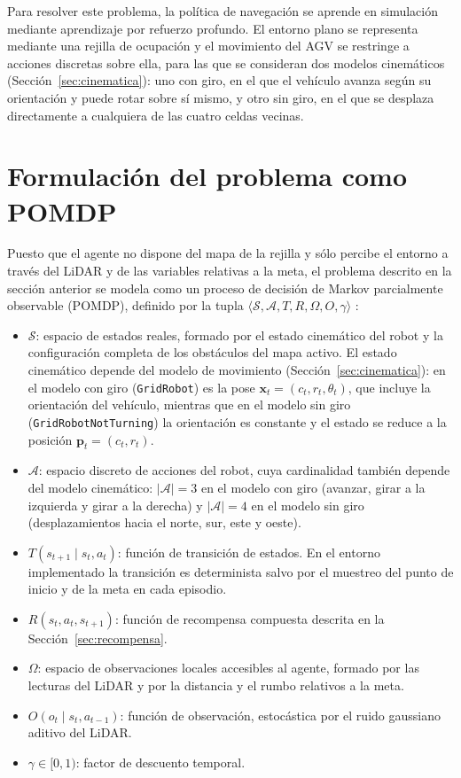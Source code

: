 Para resolver este problema, la política de navegación se aprende en
simulación mediante aprendizaje por refuerzo profundo. El entorno plano se
representa mediante una rejilla de ocupación y el movimiento del AGV se
restringe a acciones discretas sobre ella, para las que se consideran dos
modelos cinemáticos (Sección~\ref{sec:cinematica}): uno con giro, en el que
el vehículo avanza según su orientación y puede rotar sobre sí mismo, y
otro sin giro, en el que se desplaza directamente a cualquiera de las
cuatro celdas vecinas.

\section{Formulación del problema como POMDP}\label{sec:pomdp}
Puesto que el agente no dispone del mapa de la rejilla y sólo percibe el
entorno a través del LiDAR y de las variables relativas a la meta, el
problema descrito en la sección anterior se modela como un proceso de decisión de
Markov parcialmente observable (POMDP), definido por la tupla
$\langle \mathcal{S}, \mathcal{A}, T, R, \Omega, O, \gamma \rangle$
\citep{md2024novel,gao2025hierarchical}:
\begin{itemize}
    \item $\mathcal{S}$: espacio de estados reales, formado por el estado
    cinemático del robot y la configuración completa de los obstáculos del
    mapa activo. El estado cinemático depende del modelo de movimiento
    (Sección~\ref{sec:cinematica}): en el modelo con giro
    (\texttt{GridRobot}) es la pose $\mathbf{x}_t = (c_t, r_t, \theta_t)$,
    que incluye la orientación del vehículo, mientras que en el modelo sin
    giro (\texttt{GridRobotNotTurning}) la orientación es constante y el
    estado se reduce a la posición $\mathbf{p}_t = (c_t, r_t)$.
    \item $\mathcal{A}$: espacio discreto de acciones del robot, cuya
    cardinalidad también depende del modelo cinemático:
    $|\mathcal{A}|=3$ en el modelo con giro (avanzar, girar a la izquierda
    y girar a la derecha) y $|\mathcal{A}|=4$ en el modelo sin giro
    (desplazamientos hacia el norte, sur, este y oeste).
    \item $T(s_{t+1}\mid s_t, a_t)$: función de transición de estados.
    En el entorno implementado la transición es determinista salvo por el
    muestreo del punto de inicio y de la meta en cada episodio.
    \item $R(s_t, a_t, s_{t+1})$: función de recompensa compuesta descrita
    en la Sección~\ref{sec:recompensa}.
    \item $\Omega$: espacio de observaciones locales accesibles al agente,
    formado por las lecturas del LiDAR y por la distancia y el rumbo
    relativos a la meta.
    \item $O(o_t\mid s_t, a_{t-1})$: función de observación, estocástica
    por el ruido gaussiano aditivo del LiDAR.
    \item $\gamma \in [0,1)$: factor de descuento temporal.
\end{itemize}

